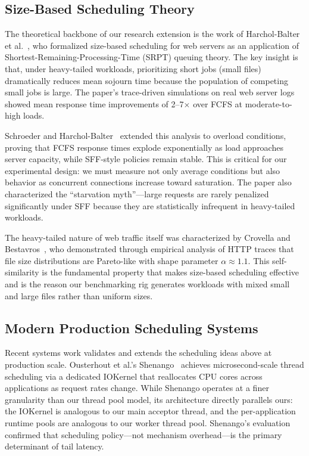 \documentclass[conference]{IEEEtran}
\begin{document}
\subsection{Size-Based Scheduling Theory}

The theoretical backbone of our research extension is the work of
Harchol-Balter et al.~\cite{harchol2003}, who formalized size-based
scheduling for web servers as an application of
Shortest-Remaining-Processing-Time (SRPT) queuing theory. The key insight is
that, under heavy-tailed workloads, prioritizing short jobs (small files)
dramatically reduces mean sojourn time because the population of competing
small jobs is large. The paper's trace-driven simulations on real web server
logs showed mean response time improvements of 2--7$\times$ over FCFS at
moderate-to-high loads.

Schroeder and Harchol-Balter~\cite{schroeder2006} extended this analysis to
overload conditions, proving that FCFS response times explode exponentially as
load approaches server capacity, while SFF-style policies remain stable. This
is critical for our experimental design: we must measure not only average
conditions but also behavior as concurrent connections increase toward
saturation. The paper also characterized the ``starvation myth''---large
requests are rarely penalized significantly under SFF because they are
statistically infrequent in heavy-tailed workloads.

The heavy-tailed nature of web traffic itself was characterized by Crovella
and Bestavros~\cite{crovella1997}, who demonstrated through empirical analysis
of HTTP traces that file size distributions are Pareto-like with shape
parameter $\alpha \approx 1.1$. This self-similarity is the fundamental
property that makes size-based scheduling effective and is the reason our
benchmarking rig generates workloads with mixed small and large files rather
than uniform sizes.

\subsection{Modern Production Scheduling Systems}

Recent systems work validates and extends the scheduling ideas above at
production scale. Ousterhout et al.'s Shenango~\cite{ousterhout2019} achieves
microsecond-scale thread scheduling via a dedicated IOKernel that reallocates
CPU cores across applications as request rates change. While Shenango operates
at a finer granularity than our thread pool model, its architecture directly
parallels ours: the IOKernel is analogous to our main acceptor thread, and the
per-application runtime pools are analogous to our worker thread pool.
Shenango's evaluation confirmed that scheduling policy---not mechanism
overhead---is the primary determinant of tail latency.
\end{document}
